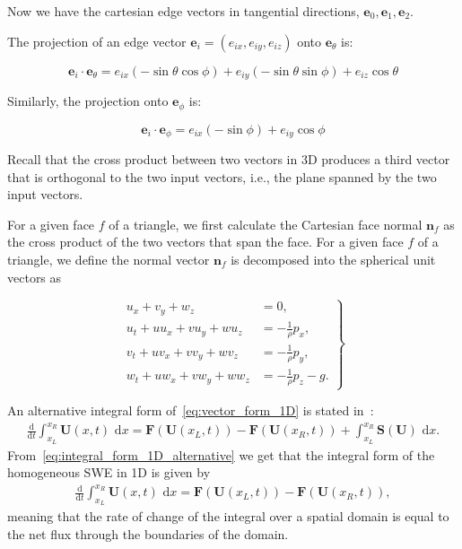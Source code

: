 Now we have the cartesian edge vectors in tangential directions, $\mathbf{e}_0, \mathbf{e}_1, \mathbf{e}_2$.

The projection of an edge vector \( \mathbf{e}_i = (e_{ix}, e_{iy}, e_{iz}) \) onto \( \mathbf{e}_\theta \) is:

\[
\mathbf{e}_i \cdot \mathbf{e}_\theta = e_{ix} \left( -\sin \theta \cos \phi \right) + e_{iy} \left( -\sin \theta \sin \phi \right) + e_{iz} \cos \theta
\]

Similarly, the projection onto \( \mathbf{e}_\phi \) is:

\[
\mathbf{e}_i \cdot \mathbf{e}_\phi = e_{ix} \left( -\sin \phi \right) + e_{iy} \cos \phi
\]

Recall that the cross product between two vectors in 3D produces a third vector that is orthogonal to the two input vectors, i.e., the plane spanned by the two input vectors.

For a given face $f$ of a triangle, we first calculate the Cartesian face normal $\mathbf{n}_f$ as the cross product of the two vectors that span the face.
For a given face $f$ of a triangle, we define the normal vector $\mathbf{n}_f$ is decomposed into the spherical unit vectors as










\begin{equation}\label{eq:momentum_conservation_all}
    \left.
    \begin{aligned}
        u_x + v_y + w_z &= 0, \\
        u_t + u u_x + v u_y + w u_z &= - \frac{1}{\rho} p_x, \\
        v_t + u v_x + v v_y + w v_z &= - \frac{1}{\rho} p_y, \\
        w_t + u w_x + v w_y + w w_z &= - \frac{1}{\rho} p_z - g.
    \end{aligned}
    \right\}
\end{equation}

An alternative integral form of~\eqref{eq:vector_form_1D} is stated in~\cite{Toro2024}:
\begin{align}\label{eq:integral_form_1D_alternative}
    \frac{\text{d}}{\text{d}t} \int_{x_L}^{x_R} \mathbf{U}(x,t) \text{ d}x = \mathbf{F}(\mathbf{U}(x_L, t)) - \mathbf{F}(\mathbf{U}(x_R, t)) + \int_{x_L}^{x_R} \mathbf{S}(\mathbf{U}) \text{ d}x.
\end{align}
From~\eqref{eq:integral_form_1D_alternative} we get that the integral form of the homogeneous SWE in 1D is given by
\begin{align}\label{eq:integral_form_1D_homogeneous}
    \frac{\text{d}}{\text{d}t} \int_{x_L}^{x_R} \mathbf{U}(x,t) \text{ d}x = \mathbf{F}(\mathbf{U}(x_L, t)) - \mathbf{F}(\mathbf{U}(x_R, t)),
\end{align}
meaning that the rate of change of the integral over a spatial domain is equal to the net flux through the boundaries of the domain.











